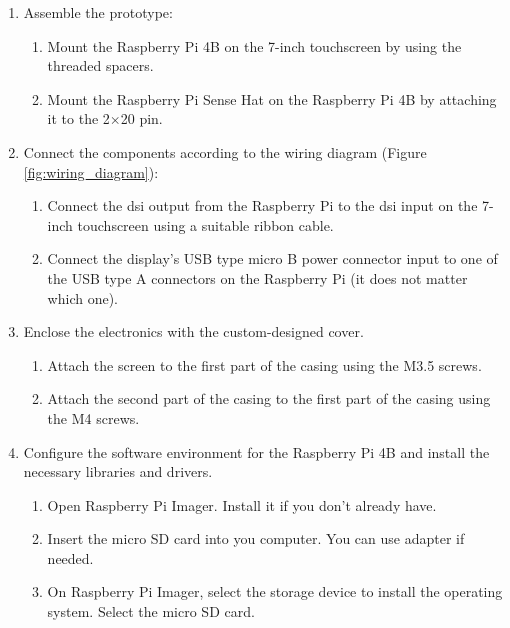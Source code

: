 \documentclass[../main.tex]{subfiles}
\begin{document}
    \begin{enumerate}
        \item Assemble the prototype:
        \begin{enumerate}
            \item Mount the Raspberry Pi 4B on the 7-inch touchscreen by using the threaded spacers.
            \item Mount the Raspberry Pi Sense Hat on the Raspberry Pi 4B by attaching it to the 2$\times$20 pin.
        \end{enumerate}
        
        \item Connect the components according to the wiring diagram (Figure \ref{fig:wiring_diagram}):
        \begin{enumerate}
            \item Connect the \gls{dsi} output from the Raspberry Pi to the \gls{dsi} input on the 7-inch touchscreen using a suitable ribbon cable.
            \item Connect the display's USB type micro B power connector input to one of the USB type A connectors on the Raspberry Pi (it does not matter which one).
        \end{enumerate}

        \item Enclose the electronics with the custom-designed cover.
        \begin{enumerate}
            \item Attach the screen to the first part of the casing using the M3.5 screws.
            \item{Attach the second part of the casing to the first part of the casing using the M4 screws.}
        \end{enumerate}
        
        \item Configure the software environment for the Raspberry Pi 4B and install the necessary libraries and drivers.
        \begin{enumerate}
            \item Open Raspberry Pi Imager. Install it if you don't already have.
            
            \item Insert the micro SD card into you computer. You can use adapter if needed.
            
            \item On Raspberry Pi Imager, select the storage device to install the operating system. Select the micro SD card.
            

\end{enumerate}
\end{enumerate}
\end{document}
